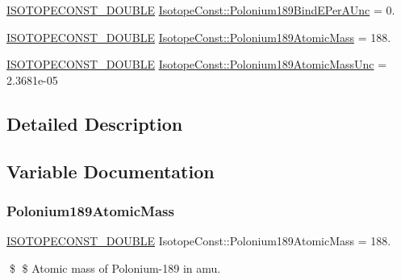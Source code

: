 \begin{DoxyCompactItemize}
\mbox{\hyperlink{group___isotope_const-_macros_ga8f45a7272ce02c0b4c65c44636ed719a}{I\+S\+O\+T\+O\+P\+E\+C\+O\+N\+S\+T\+\_\+\+D\+O\+U\+B\+LE}} \mbox{\hyperlink{group___isotope_const-_polonium-_po189_gac3beffd3d49655c888c822d0017d714e}{Isotope\+Const\+::\+Polonium189\+Bind\+E\+Per\+A\+Unc}} = 0.
\item 
\mbox{\hyperlink{group___isotope_const-_macros_ga8f45a7272ce02c0b4c65c44636ed719a}{I\+S\+O\+T\+O\+P\+E\+C\+O\+N\+S\+T\+\_\+\+D\+O\+U\+B\+LE}} \mbox{\hyperlink{group___isotope_const-_polonium-_po189_ga1c9e8a4ab4171f1f25dd0dc289b7e814}{Isotope\+Const\+::\+Polonium189\+Atomic\+Mass}} = 188.
\item 
\mbox{\hyperlink{group___isotope_const-_macros_ga8f45a7272ce02c0b4c65c44636ed719a}{I\+S\+O\+T\+O\+P\+E\+C\+O\+N\+S\+T\+\_\+\+D\+O\+U\+B\+LE}} \mbox{\hyperlink{group___isotope_const-_polonium-_po189_ga449192805e8ccdf778f78dd0c794020c}{Isotope\+Const\+::\+Polonium189\+Atomic\+Mass\+Unc}} = 2.\+3681e-\/05
\end{DoxyCompactItemize}


\subsection{Detailed Description}


\subsection{Variable Documentation}
\mbox{\label{group___isotope_const-_polonium-_po189_ga1c9e8a4ab4171f1f25dd0dc289b7e814}} 
\subsubsection{\texorpdfstring{Polonium189\+Atomic\+Mass}{Polonium189AtomicMass}}
{\footnotesize\ttfamily \mbox{\hyperlink{group___isotope_const-_macros_ga8f45a7272ce02c0b4c65c44636ed719a}{I\+S\+O\+T\+O\+P\+E\+C\+O\+N\+S\+T\+\_\+\+D\+O\+U\+B\+LE}} Isotope\+Const\+::\+Polonium189\+Atomic\+Mass = 188.}

\$ \$ Atomic mass of Polonium-\/189 in amu. \mbox{\label{group___isotope_const-_polonium-_po189_ga449192805e8ccdf778f78dd0c794020c}} 
